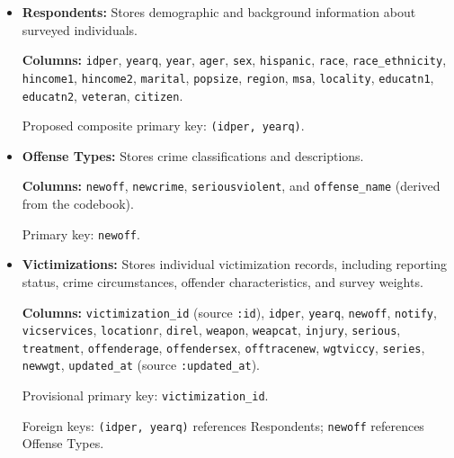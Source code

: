 \documentclass{article}
\begin{document}
\begin{itemize}
  \item \textbf{Respondents:}
    Stores demographic and background information
    about surveyed individuals.

    \textbf{Columns:}
    \texttt{idper}, \texttt{yearq}, \texttt{year},
    \texttt{ager}, \texttt{sex}, \texttt{hispanic},
    \texttt{race}, \texttt{race\_ethnicity},
    \texttt{hincome1}, \texttt{hincome2},
    \texttt{marital}, \texttt{popsize},
    \texttt{region}, \texttt{msa}, \texttt{locality},
    \texttt{educatn1}, \texttt{educatn2},
    \texttt{veteran}, \texttt{citizen}.

    Proposed composite primary key:
    \texttt{(idper, yearq)}.

  \item \textbf{Offense Types:}
    Stores crime classifications and descriptions.

    \textbf{Columns:}
    \texttt{newoff}, \texttt{newcrime},
    \texttt{seriousviolent}, and
    \texttt{offense\_name} (derived from the codebook).

    Primary key: \texttt{newoff}.

  \item \textbf{Victimizations:}
    Stores individual victimization records,
    including reporting status, crime circumstances,
    offender characteristics, and survey weights.

    \textbf{Columns:}
    \texttt{victimization\_id} (source \texttt{:id}),
    \texttt{idper}, \texttt{yearq}, \texttt{newoff},
    \texttt{notify}, \texttt{vicservices},
    \texttt{locationr}, \texttt{direl},
    \texttt{weapon}, \texttt{weapcat},
    \texttt{injury}, \texttt{serious},
    \texttt{treatment}, \texttt{offenderage},
    \texttt{offendersex}, \texttt{offtracenew},
    \texttt{wgtviccy}, \texttt{series},
    \texttt{newwgt}, \texttt{updated\_at}
    (source \texttt{:updated\_at}).

    Provisional primary key:
    \texttt{victimization\_id}.

    Foreign keys:
    \texttt{(idper, yearq)} references Respondents;
    \texttt{newoff} references Offense Types.
\end{itemize}
\end{document}

